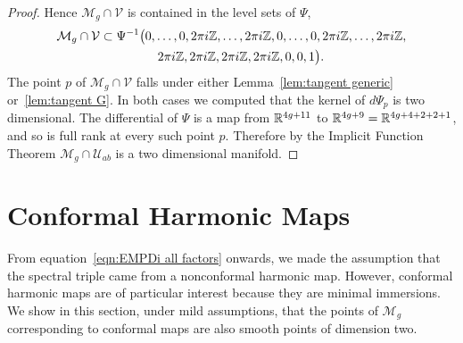 \documentclass{article}
\begin{document}
\begin{thm}
\begin{proof}
Hence $\mathcal{M}_g \cap \mathcal{V}$ is contained in the level sets of $\Psi$,
\begin{align*}
\mathcal{M}_g \cap \mathcal{V}
\subset \Psi^{-1}\big( &0,\dots,0,2\pi i\mathbb{Z},\dots,2\pi i\mathbb{Z},0,\dots,0,2\pi i\mathbb{Z},\dots,2\pi i\mathbb{Z}, \\
&\quad 2\pi i\mathbb{Z},2\pi i\mathbb{Z},2\pi i\mathbb{Z},2\pi i\mathbb{Z},0,0,1 \big).
\end{align*}
The point $p$ of $\mathcal{M}_g \cap \mathcal{V}$ falls under either Lemma~\ref{lem:tangent generic} or~\ref{lem:tangent G}. In both cases we computed that the kernel of $d\Psi_p$ is two dimensional. The differential of $\Psi$ is a map from $\mathbb{R}^{4g+11}$ to $\mathbb{R}^{4g+9} = \mathbb{R}^{4g+4+2+2+1}$, and so is full rank at every such point $p$. Therefore by the Implicit Function Theorem $\mathcal{M}_g \cap \mathcal{U}_{ab}$ is a two dimensional manifold.
\end{proof}
\end{thm}




\section{Conformal Harmonic Maps}\label{sec:conformal}

From equation~\eqref{eqn:EMPDi all factors} onwards, we made the assumption that the spectral triple came from a nonconformal harmonic map. However, conformal harmonic maps are of particular interest because they are minimal immersions. We show in this section, under mild assumptions, that the points of $\mathcal{M}_g$ corresponding to conformal maps are also smooth points of dimension two. 
\end{document}
